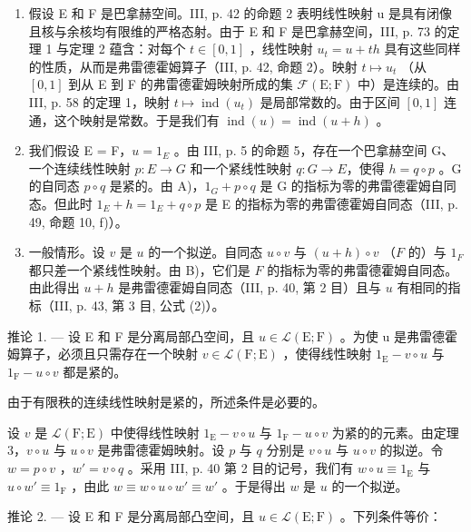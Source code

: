 \begin{enumerate}
\def\labelenumi{\Alph{enumi})}
\item
  假设 E 和 F 是巴拿赫空间。III, p. 42 的命题 2 表明线性映射 u 是具有闭像且核与余核均有限维的严格态射。由于 E 和 F 是巴拿赫空间，III, p. 73 的定理 1 与定理 2 蕴含：对每个 \(t \in [0,1]\) ，线性映射 \(u_t = u + th\) 具有这些同样的性质，从而是弗雷德霍姆算子（III, p. 42, 命题 2）。映射 \(t \mapsto u_t\) （从 \([0,1]\) 到从 E 到 F 的弗雷德霍姆映射所成的集 \(\mathcal{F}(\mathrm{E};\mathrm{F})\) 中）是连续的。由 III, p. 58 的定理 1，映射 \(t \mapsto \operatorname{ind}(u_t)\) 是局部常数的。由于区间 \([0,1]\) 连通，这个映射是常数。于是我们有 \(\operatorname{ind}(u) = \operatorname{ind}(u + h)\) 。
\item
  我们假设 E = F，\(u = 1_{E}\) 。由 III, p. 5 的命题 5，存在一个巴拿赫空间 G、一个连续线性映射 \(p: E \to G\) 和一个紧线性映射 \(q: G \to E\)，使得 \(h = q \circ p\) 。G 的自同态 \(p \circ q\) 是紧的。由 A)，\(1_{G} + p \circ q\) 是 G 的指标为零的弗雷德霍姆自同态。但此时 \(1_{E} + h = 1_{E} + q \circ p\) 是 E 的指标为零的弗雷德霍姆自同态（III, p. 49, 命题 10, f)）。
\item
  一般情形。设 \(v\) 是 \(u\) 的一个拟逆。自同态 \(u \circ v\) 与 \((u + h) \circ v\) （\(F\) 的）与 \(1_{F}\) 都只差一个紧线性映射。由 B)，它们是 \(F\) 的指标为零的弗雷德霍姆自同态。由此得出 \(u + h\) 是弗雷德霍姆自同态（III, p. 40, 第 2 目）且与 \(u\) 有相同的指标（III, p. 43, 第 3 目, 公式 (2)）。
\end{enumerate}

推论 1. --- 设 E 和 F 是分离局部凸空间，且 \(u \in \mathcal{L}(\mathrm{E};\mathrm{F})\) 。为使 u 是弗雷德霍姆算子，必须且只需存在一个映射 \(v \in \mathcal{L}(\mathrm{F};\mathrm{E})\) ，使得线性映射 \(1_{\mathrm{E}} - v \circ u\) 与 \(1_{\mathrm{F}} - u \circ v\) 都是紧的。

由于有限秩的连续线性映射是紧的，所述条件是必要的。

设 \(v\) 是 \(\mathcal{L}(\mathrm{F};\mathrm{E})\) 中使得线性映射 \(1_{\mathrm{E}} - v \circ u\) 与 \(1_{\mathrm{F}} - u \circ v\) 为紧的的元素。由定理 3，\(v \circ u\) 与 \(u \circ v\) 是弗雷德霍姆映射。设 \(p\) 与 \(q\) 分别是 \(v \circ u\) 与 \(u \circ v\) 的拟逆。令 \(w = p \circ v\) ，\(w' = v \circ q\) 。采用 III, p. 40 第 2 目的记号，我们有 \(w \circ u \equiv 1_{\mathrm{E}}\) 与 \(u \circ w' \equiv 1_{\mathrm{F}}\) ，由此 \(w \equiv w \circ u \circ w' \equiv w'\) 。于是得出 \(w\) 是 \(u\) 的一个拟逆。

推论 2. --- 设 E 和 F 是分离局部凸空间，且 \(u \in \mathcal{L}(\mathrm{E};\mathrm{F})\) 。下列条件等价：


